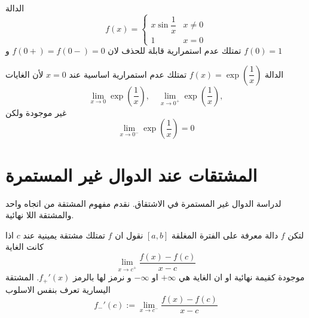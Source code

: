 \begin{example}
	الدالة
	\[
	f(x) =
	\begin{cases}
		x\sin \dfrac{1}{x} & x\neq0 \\
		1 & x=0
	\end{cases}
	\]
	تمتلك عدم استمرارية قابلة للحذف لان
	 $f(0+) = f(0-) = 0$
	 و $f(0) = 1$ 
	 	\begin{figure}[H]
	 	\centering
	 	\caption{}
	 \end{figure}
\end{example}

\begin{example}
	الدالة $f(x) = \exp\left(\dfrac{1}{x}\right)$ تمتلك عدم استمرارية اساسية عند $x=0$ لأن الغايات
	\[
	\lim\limits_{x\to 0} \exp\left(\frac{1}{x}\right), \quad 	\lim\limits_{x\to 0^+} \exp\left(\frac{1}{x}\right), 
	\]
	غير موجودة ولكن 
	\[
		\lim\limits_{x\to 0^-} \exp\left(\frac{1}{x}\right) = 0
	\]
\end{example}


\newpage
\section{المشتقات عند الدوال غير المستمرة}
لدراسة الدوال غير المستمرة في الاشتقاق. نقدم مفهوم المشتقة من اتجاه واحد والمشتقة اللا نهائية.
\begin{definition}
	لتكن $f$ دالة معرفة على الفترة المغلقة $[a, b]$ نقول ان $f$ تمتلك مشتقة يمينية عند $c$ اذا كانت الغاية 
	\[
	\lim\limits_{x\to c^+} \frac{f(x) - f(c)}{x-c}
	\]
	موجودة كقيمة نهائية او ان الغاية هي $+\infty$ او $-\infty$ و نرمز لها بالرمز $f_+'(x)$. المشتقة اليسارية تعرف بنفس الاسلوب
	\[
f_-'(c):=	\lim\limits_{x\to c^-} \frac{f(x) - f(c)}{x-c}
	\]
\end{definition}

